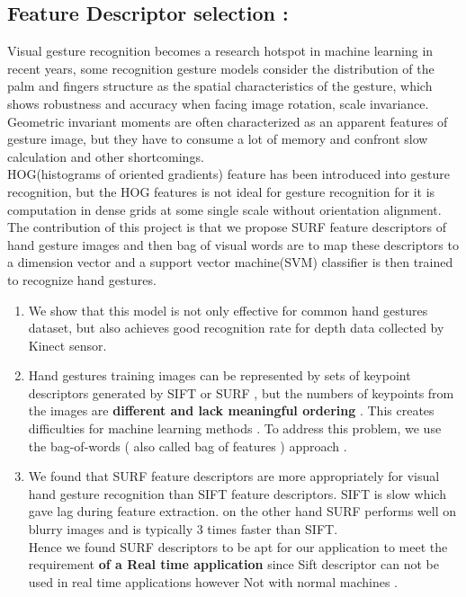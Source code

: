\subsection{Feature Descriptor selection :}
Visual gesture
recognition becomes a research hotspot in machine learning
in recent years, some recognition gesture models consider the
distribution of the palm and fingers structure as the spatial
characteristics of the gesture, which shows robustness and accuracy
when facing image rotation, scale invariance.\\ Geometric
invariant moments are often characterized as an apparent
features of gesture image, but they have to consume a lot of
memory and confront slow calculation and other shortcomings.\\ HOG(histograms of oriented gradients) feature has been introduced into gesture
recognition, but the HOG features is not ideal for gesture
recognition for it is computation in dense grids at some single
scale without orientation alignment.\\ The contribution of this project is that we propose SURF
feature descriptors of hand gesture images and then bag of
visual words are to map these descriptors to a dimension vector and a  support vector machine(SVM) classifier is then  trained to
recognize hand gestures.
\begin{enumerate}
\item We show that this model is not only
effective for common hand gestures dataset, but also achieves
good  recognition rate for depth
data collected by Kinect sensor.
\item Hand gestures training images can be represented by sets of
keypoint descriptors generated by SIFT or SURF , but the numbers of keypoints from the
images are \textbf{different and lack meaningful ordering }. This
creates difficulties for machine learning methods . To address
this problem, we use the bag-of-words ( also called bag of features )  approach .
\item We found
that SURF feature descriptors are more appropriately for visual
hand gesture recognition than SIFT feature descriptors.
SIFT is  slow which  gave lag during feature extraction. on the other hand SURF performs well on blurry images and is typically 3 times faster than SIFT.\\ Hence we found SURF descriptors to be apt for our application to meet the requirement  \textbf{of a  Real time application} since Sift descriptor can not be used in real time applications however Not with normal machines .
\end{enumerate}


